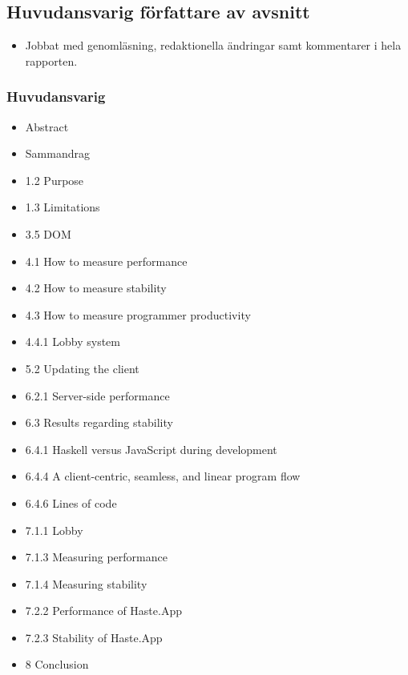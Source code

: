 \subsection{Huvudansvarig författare av avsnitt}
\begin{itemize}
  \item Jobbat med genomläsning, redaktionella ändringar samt kommentarer i hela rapporten.
\end{itemize}

\subsubsection{Huvudansvarig}
\begin{itemize}
    \item Abstract
    \item Sammandrag
    \item 1.2 Purpose
    \item 1.3 Limitations
    \item 3.5 DOM
    \item 4.1 How to measure performance
    \item 4.2 How to measure stability
    \item 4.3 How to measure programmer productivity
    \item 4.4.1 Lobby system
    \item 5.2 Updating the client
    \item 6.2.1 Server-side performance
    \item 6.3 Results regarding stability
    \item 6.4.1 Haskell versus JavaScript during development
    \item 6.4.4 A client-centric, seamless, and linear program flow
    \item 6.4.6 Lines of code
    \item 7.1.1 Lobby
    \item 7.1.3 Measuring performance
    \item 7.1.4 Measuring stability
    \item 7.2.2 Performance of Haste.App
    \item 7.2.3 Stability of Haste.App
    \item 8 Conclusion
\end{itemize}

